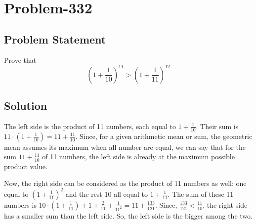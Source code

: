 \documentclass{article}
\begin{document}
\section*{Problem-332}
\subsection*{Problem Statement}
Prove that
\[
	\left( 1 + \frac{1}{10} \right)^{11} > \left( 1 + \frac{1}{11} \right)^{12}
\]

\subsection*{Solution}
The left side is the product of 11 numbers, each equal to $1 + \frac{1}{10}$. Their sum is $11 \cdot \left(1 + \frac{1}{10}\right) = 11+\frac{11}{10}$. Since, for a given arithmetic mean or sum, the geometric mean assumes its maximum when all number are equal, we can say that for the sum $11 + \frac{11}{10}$ of 11 numbers, the left side is already at the maximum possible product value.

Now, the right side can be considered as the product of 11 numbers as well: one equal to $\left(1+\frac{1}{11}\right)^2$ and the rest 10 all equal to $1 + \frac{1}{11}$. The sum of these 11 numbers is $10 \cdot \left(1 + \frac{1}{11}\right) + 1 + \frac{2}{11} + \frac{1}{11^2} = 11 + \frac{133}{121}$. Since, $\frac{133}{121} < \frac{11}{10}$, the right side has a smaller sum than the left side. So, the left side is the bigger among the two.
\end{document}
